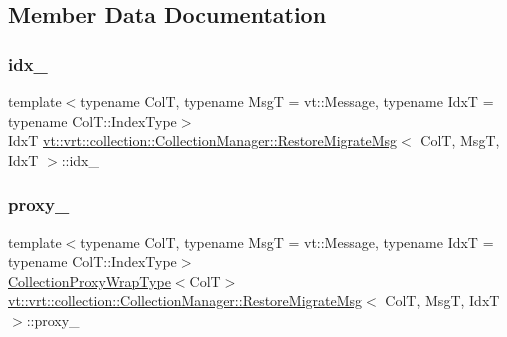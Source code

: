 \subsection{Member Data Documentation}
\mbox{\label{structvt_1_1vrt_1_1collection_1_1_collection_manager_1_1_restore_migrate_msg_a3c90515d657d0e462f4bf08f07baa43a}} 
\subsubsection{\texorpdfstring{idx\+\_\+}{idx\_}}
{\footnotesize\ttfamily template$<$typename ColT, typename MsgT = vt\+::\+Message, typename IdxT = typename Col\+T\+::\+Index\+Type$>$ \\
IdxT \hyperlink{structvt_1_1vrt_1_1collection_1_1_collection_manager_1_1_restore_migrate_msg}{vt\+::vrt\+::collection\+::\+Collection\+Manager\+::\+Restore\+Migrate\+Msg}$<$ ColT, MsgT, IdxT $>$\+::idx\+\_\+}

\mbox{\label{structvt_1_1vrt_1_1collection_1_1_collection_manager_1_1_restore_migrate_msg_a7c22fe526d60f1209cb156721afc01ba}} 
\subsubsection{\texorpdfstring{proxy\+\_\+}{proxy\_}}
{\footnotesize\ttfamily template$<$typename ColT, typename MsgT = vt\+::\+Message, typename IdxT = typename Col\+T\+::\+Index\+Type$>$ \\
\hyperlink{structvt_1_1vrt_1_1collection_1_1_collection_manager_a56458ed7f9bb22b631b9b3a745f42f94}{Collection\+Proxy\+Wrap\+Type}$<$ColT$>$ \hyperlink{structvt_1_1vrt_1_1collection_1_1_collection_manager_1_1_restore_migrate_msg}{vt\+::vrt\+::collection\+::\+Collection\+Manager\+::\+Restore\+Migrate\+Msg}$<$ ColT, MsgT, IdxT $>$\+::proxy\+\_\+}

